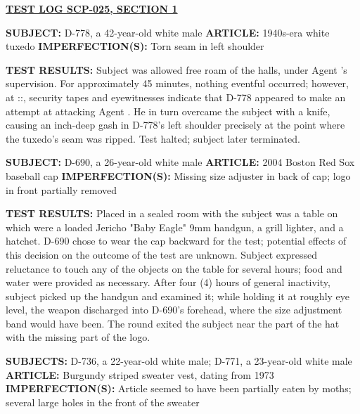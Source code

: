 \begin{leftbar}
\underline{\textbf{TEST LOG SCP-025, SECTION 1}}
\begin{flushleft}
\textbf{SUBJECT:} D-778, a 42-year-old white male\linebreak
\textbf{ARTICLE:} 1940s-era white tuxedo\linebreak
\textbf{IMPERFECTION(S):} Torn seam in left shoulder
\end{flushleft}
\textbf{TEST RESULTS:} Subject was allowed free roam of the halls, under Agent 's supervision. For approximately 45 minutes, nothing eventful occurred; however, at ::, security tapes and eyewitnesses indicate that D-778 appeared to make an attempt at attacking Agent . He in turn overcame the subject with a knife, causing an inch-deep gash in D-778's left shoulder precisely at the point where the tuxedo's seam was ripped. Test halted; subject later terminated.
\begin{flushleft}
\textbf{SUBJECT:} D-690, a 26-year-old white male\linebreak
\textbf{ARTICLE:} 2004 Boston Red Sox baseball cap\linebreak
\textbf{IMPERFECTION(S):} Missing size adjuster in back of cap; logo in front partially removed
\end{flushleft}
\textbf{TEST RESULTS:} Placed in a sealed room with the subject was a table on which were a loaded Jericho "Baby Eagle" 9mm handgun, a grill lighter, and a hatchet. D-690 chose to wear the cap backward for the test; potential effects of this decision on the outcome of the test are unknown. Subject expressed reluctance to touch any of the objects on the table for several hours; food and water were provided as necessary. After four (4) hours of general inactivity, subject picked up the handgun and examined it; while holding it at roughly eye level, the weapon discharged into D-690's forehead, where the size adjustment band would have been. The round exited the subject near the part of the hat with the missing part of the logo.
\begin{flushleft}
\textbf{SUBJECTS:} D-736, a 22-year-old white male; D-771, a 23-year-old white male\linebreak
\textbf{ARTICLE:} Burgundy striped sweater vest, dating from 1973\linebreak
\textbf{IMPERFECTION(S):} Article seemed to have been partially eaten by moths; several large holes in the front of the sweater
\end{flushleft}

\end{leftbar}
